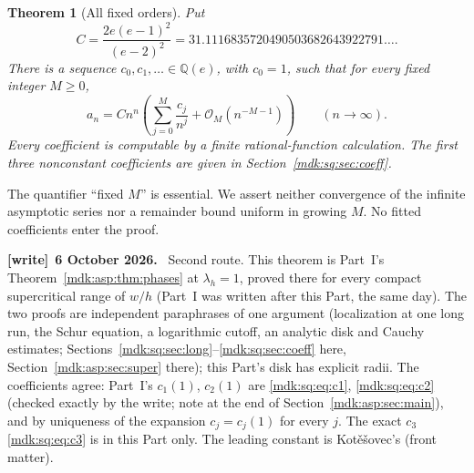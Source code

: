 \documentclass[11pt,letterpaper]{article}
\numberwithin{equation}{section}
\newtheorem{theorem}{Theorem}[section]
\theoremstyle{remark}\newtheorem{remark}[theorem]{Remark}
\newcommand{\Oh}{\mathcal O}\newcommand{\Q}{\mathbb Q}\newcommand{\N}{\mathbb N}\newcommand{\R}{\mathbb R}
\newenvironment{writenote}[1][]{\par\smallskip\begingroup\small
 \noindent\textbf{[write]}\if\relax\detokenize{#1}\relax\else~\textbf{#1.}\fi\ }%
 {\par\endgroup\smallskip}
\begin{document}
\begin{theorem}[All fixed orders]\label{mdk:sq:thm:all}
Put
\begin{equation}\label{mdk:sq:eq:C}
C=\frac{2e(e-1)^2}{(e-2)^2}=31.1116835720490503682643922791\ldots.
\end{equation}
There is a sequence $c_0,c_1,\ldots\in\Q(e)$, with $c_0=1$, such that for every fixed integer $M\ge0$,
\begin{equation}\label{mdk:sq:eq:main}
a_n=Cn^n\left(\sum_{j=0}^M\frac{c_j}{n^j}+\Oh_M(n^{-M-1})\right)
\qquad(n\longrightarrow\infty).
\end{equation}
Every coefficient is computable by a finite rational-function calculation. The first three nonconstant coefficients are given in Section~\ref{mdk:sq:sec:coeff}.
\end{theorem}
The quantifier ``fixed $M$'' is essential. We assert neither convergence of the infinite asymptotic series nor a remainder bound uniform in growing $M$. No fitted coefficients enter the proof.
\begin{writenote}[6 October 2026]
Second route. This theorem is Part~I's Theorem~\ref{mdk:asp:thm:phases} at $\lambda_h=1$, proved there for every compact supercritical range of $w/h$ (Part~I was written after this Part, the same day). The two proofs are independent paraphrases of one argument (localization at one long run, the Schur equation, a logarithmic cutoff, an analytic disk and Cauchy estimates; Sections~\ref{mdk:sq:sec:long}--\ref{mdk:sq:sec:coeff} here, Section~\ref{mdk:asp:sec:super} there); this Part's disk has explicit radii. The coefficients agree: Part~I's $c_1(1)$, $c_2(1)$ are \eqref{mdk:sq:eq:c1}, \eqref{mdk:sq:eq:c2} (checked exactly by the write; note at the end of Section~\ref{mdk:asp:sec:main}), and by uniqueness of the expansion $c_j=c_j(1)$ for every $j$. The exact $c_3$ \eqref{mdk:sq:eq:c3} is in this Part only. The leading constant is Kot\v e\v sovec's (front matter).
\end{writenote}
\end{document}
